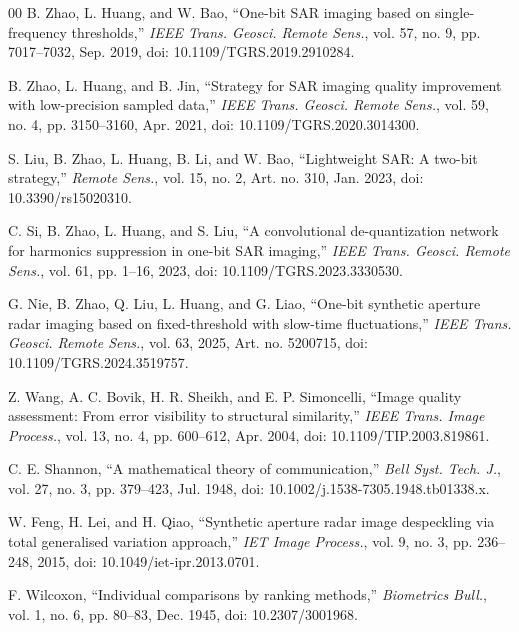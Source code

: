 \documentclass[conference]{IEEEtran}
\begin{document}
\begin{thebibliography}{00}
B. Zhao, L. Huang, and W. Bao, ``One-bit SAR imaging based on single-frequency thresholds,'' \textit{IEEE Trans. Geosci. Remote Sens.}, vol. 57, no. 9, pp. 7017--7032, Sep. 2019, doi: 10.1109/TGRS.2019.2910284.

B. Zhao, L. Huang, and B. Jin, ``Strategy for SAR imaging quality improvement with low-precision sampled data,'' \textit{IEEE Trans. Geosci. Remote Sens.}, vol. 59, no. 4, pp. 3150--3160, Apr. 2021, doi: 10.1109/TGRS.2020.3014300.

S. Liu, B. Zhao, L. Huang, B. Li, and W. Bao, ``Lightweight SAR: A two-bit strategy,'' \textit{Remote Sens.}, vol. 15, no. 2, Art. no. 310, Jan. 2023, doi: 10.3390/rs15020310.

C. Si, B. Zhao, L. Huang, and S. Liu, ``A convolutional de-quantization network for harmonics suppression in one-bit SAR imaging,'' \textit{IEEE Trans. Geosci. Remote Sens.}, vol. 61, pp. 1--16, 2023, doi: 10.1109/TGRS.2023.3330530.

G. Nie, B. Zhao, Q. Liu, L. Huang, and G. Liao, ``One-bit synthetic aperture radar imaging based on fixed-threshold with slow-time fluctuations,'' \textit{IEEE Trans. Geosci. Remote Sens.}, vol. 63, 2025, Art. no. 5200715, doi: 10.1109/TGRS.2024.3519757.

Z. Wang, A. C. Bovik, H. R. Sheikh, and E. P. Simoncelli, ``Image quality assessment: From error visibility to structural similarity,'' \textit{IEEE Trans. Image Process.}, vol. 13, no. 4, pp. 600--612, Apr. 2004, doi: 10.1109/TIP.2003.819861.

C. E. Shannon, ``A mathematical theory of communication,'' \textit{Bell Syst. Tech. J.}, vol. 27, no. 3, pp. 379--423, Jul. 1948, doi: 10.1002/j.1538-7305.1948.tb01338.x.

W. Feng, H. Lei, and H. Qiao, ``Synthetic aperture radar image despeckling via total generalised variation approach,'' \textit{IET Image Process.}, vol. 9, no. 3, pp. 236--248, 2015, doi: 10.1049/iet-ipr.2013.0701.

F. Wilcoxon, ``Individual comparisons by ranking methods,'' \textit{Biometrics Bull.}, vol. 1, no. 6, pp. 80--83, Dec. 1945, doi: 10.2307/3001968.

\end{thebibliography}
\end{document}
